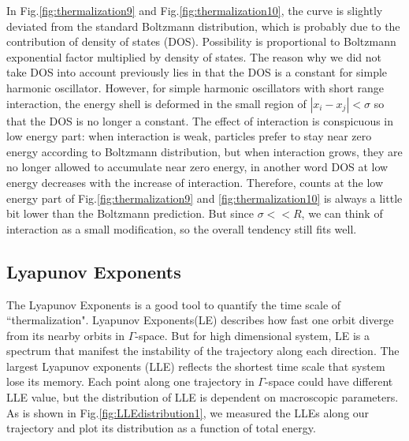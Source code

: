 \documentclass[aps,preprintnumbers,onecolumn,amsmath,amssymb,floatfix,pra]{revtex4-1}
\begin{document}
In Fig.\ref{fig:thermalization9} and Fig.\ref{fig:thermalization10}, the curve is slightly deviated
from the standard Boltzmann distribution, which is probably due to the contribution of density of
states (DOS). Possibility is proportional to Boltzmann exponential factor multiplied by density of
states. The reason why we did not take DOS into account previously lies in that the DOS is a
constant for simple harmonic oscillator. However, for simple harmonic oscillators with short range
interaction, the energy shell is deformed in the small region of $|x_i-x_j|<\sigma$ so that the DOS
is no longer a constant. The effect of interaction is conspicuous in low energy part: when
interaction is weak, particles prefer to stay near zero energy according to Boltzmann distribution,
but when interaction grows, they are no longer allowed to accumulate near zero energy, in another
word DOS at low energy decreases with the increase of interaction. Therefore, counts at the low
energy part of Fig.\ref{fig:thermalization9} and \ref{fig:thermalization10} is always a little bit
lower than the Boltzmann prediction. But since $\sigma<<R$, we can think of interaction as a small
modification, so the overall tendency still fits well.

\subsection{Lyapunov Exponents}
The Lyapunov Exponents is a good tool to quantify the time scale of ``thermalization". Lyapunov Exponents(LE) describes how fast one orbit diverge from its nearby orbits in $\Gamma$-space. But for high dimensional system, LE is a spectrum that manifest the instability of the trajectory along each direction. The largest Lyapunov exponents (LLE) reflects the shortest time scale that system lose its memory. Each point along one trajectory in $\Gamma$-space could have different LLE value, but the distribution of LLE is dependent on macroscopic parameters. As is shown in Fig.\ref{fig:LLEdistribution1}, we measured the LLEs along our trajectory and plot its distribution as a function of total energy.
\end{document}
